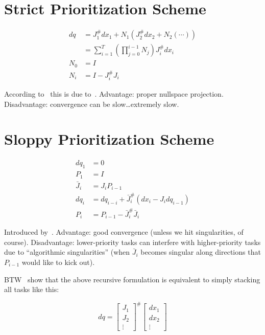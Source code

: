 \documentclass{article}
\begin{document}
\section{Strict Prioritization Scheme}

\begin{align}
  dq &= J_1^\#dx_1 + N_1 ( J_2^\#dx_2 + N_2 ( \cdots )) \\
  &= \sum_{i=1}^T \left( \prod_{j=0}^{i-1}N_j \right) J_i^\#dx_i\\
  N_0 &= I \\
  N_i &= I - J_i^\#J_i
\end{align}

According to~\cite{mistry:2007} this is due to~\cite{chiaverini:1997}.
Advantage: proper nullspace projection.
Disadvantage: convergence can be slow\ldots extremely slow.



\section{Sloppy Prioritization Scheme}

\begin{align}
  dq_1 &= 0 \\
  P_1 &= I \\
  \bar{J}_i &= J_iP_{i-1} \\
  dq_i &= dq_{i-i} + \bar{J}_i^\#(dx_i-J_idq_{i-1}) \\
  P_i &= P_{i-1} - \bar{J}_i^\#\bar{J}_i
\end{align}

Introduced by~\cite{siciliano:1991}.
Advantage: good convergence (unless we hit singularities, of course).
Disadvantage: lower-priority tasks can interfere with higher-priority tasks due to ``algorithmic singularities'' (when $\bar{J}_i$ becomes singular along directions that $P_{i-1}$ would like to kick out).

BTW~\cite{mistry:2007} show that the above recursive formulation is equivalent to simply stacking all tasks like this:

\begin{equation}
  dq =
  \begin{bmatrix}
    J_1 \\
    J_2 \\
    \vdots
  \end{bmatrix}
  ^\#
  \begin{bmatrix}
    dx_1 \\
    dx_2 \\
    \vdots
  \end{bmatrix}
\end{equation}
\end{document}
